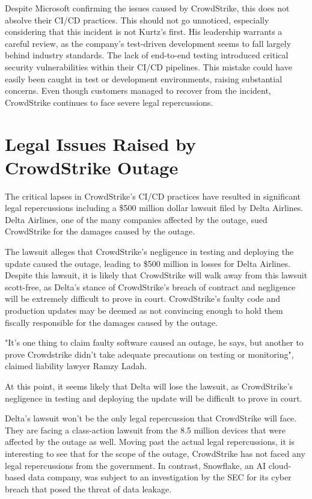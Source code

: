 Despite Microsoft confirming the issues caused by CrowdStrike, this does not absolve their CI/CD practices. This should not go unnoticed, especially considering that this incident is not Kurtz's first. His leadership warrants a careful review, as the company's test-driven development seems to fall largely behind industry standards. The lack of end-to-end testing introduced critical security vulnerabilities within their CI/CD pipelines. This mistake could have easily been caught in test or development environments, raising substantial concerns.
Even though customers managed to recover from the incident, CrowdStrike continues to face severe legal repercussions.

\newpage

\section{Legal Issues Raised by CrowdStrike Outage}
The critical lapses in CrowdStrike's CI/CD practices have resulted in significant legal repercussions including a \$500 million dollar lawsuit
filed by Delta Airlines. Delta Airlines, one of the many companies affected by the outage, sued CrowdStrike for the damages caused by the outage. \cite{delta_sues_crowdstrike}

The lawsuit alleges that CrowdStrike's negligence in testing and deploying the update caused the outage, leading to \$500 million in losses for Delta Airlines.
Despite this lawsuit, it is likely that CrowdStrike will walk away from this lawsuit scott-free, as Delta's stance of CrowdStrike's breach of contract and negligence will be extremely difficult to prove in court. CrowdStrike's faulty code and production updates may be deemed as not convincing enough to hold them fiscally responsible for the damages caused by the outage.

"It's one thing to claim faulty software caused an outage, he says, but another to prove Crowdstrike didn’t take adequate precautions on testing or monitoring", claimed liability lawyer Ramzy Ladah.
\cite{delta_lose}

At this point, it seems likely that Delta will lose the lawsuit, as CrowdStrike's negligence in testing and deploying the update will be difficult to prove in court.

Delta's lawsuit won't be the only legal repercussion that CrowdStrike will face. They are facing a class-action lawsuit from the 8.5 million devices that were affected by the outage as well. Moving past the actual legal repercussions, it is interesting to see that for the scope of the outage, CrowdStrike has not faced any legal repercussions from the government. In contrast, Snowflake, an AI cloud-based data company, was subject to an investigation by the SEC for its cyber breach that posed the threat of data leakage. \cite{snowflake_sec}

